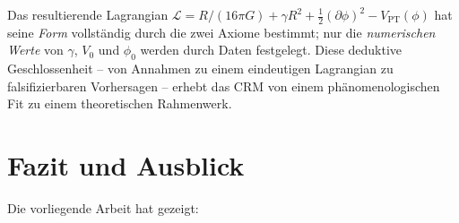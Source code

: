 \documentclass[aps,prd,twocolumn,superscriptaddress,nofootinbib]{revtex4-2}
\begin{document}
Das resultierende Lagrangian $\mathcal{L} = R/(16\pi G) + \gamma R^2 + \frac{1}{2}(\partial\phi)^2 - V_{\mathrm{PT}}(\phi)$ hat seine \textit{Form} vollst\"andig durch die zwei Axiome bestimmt; nur die \textit{numerischen Werte} von $\gamma$, $V_0$ und $\phi_0$ werden durch Daten festgelegt. Diese deduktive Geschlossenheit -- von Annahmen zu einem eindeutigen Lagrangian zu falsifizierbaren Vorhersagen -- erhebt das CRM von einem ph\"anomenologischen Fit zu einem theoretischen Rahmenwerk.

\section{Fazit und Ausblick}
\label{sec:fazit}

Die vorliegende Arbeit hat gezeigt:
\end{document}
